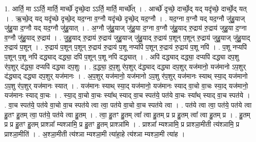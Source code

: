 \documentclass[17pt]{extarticle}
\begin{document}
1. आर्ति॒ मा ऽऽर्ति॒ मार्ति॒ मार्च्छे॑ दृच्छे॒दा ऽऽर्ति॒ मार्ति॒ मार्च्छे᳚त् । . आर्च्छे॑ दृच्छे॒ दार्च्छे॒द् यद् यदृ॑च्छे॒ दार्च्छे॒द् यत् । . ऋ॒च्छे॒द् यद् यदृ॑च्छे दृच्छे॒द् यद॒ग्ना व॒ग्नौ यदृ॑च्छे दृच्छे॒द् यद॒ग्नौ । . यद॒ग्ना व॒ग्नौ यद् यद॒ग्नौ जु॑हु॒याज् जु॑हु॒या द॒ग्नौ यद् यद॒ग्नौ जु॑हु॒यात् । . अ॒ग्नौ जु॑हु॒याज् जु॑हु॒या द॒ग्ना व॒ग्नौ जु॑हु॒याद् रु॒द्राय॑ रु॒द्राय॑ जुहु॒या द॒ग्ना व॒ग्नौ जु॑हु॒याद् रु॒द्राय॑ । . जु॒हु॒याद् रु॒द्राय॑ रु॒द्राय॑ जुहु॒याज् जु॑हु॒याद् रु॒द्राय॑ प॒शून् प॒शून् रु॒द्राय॑ जुहु॒याज् जु॑हु॒याद् रु॒द्राय॑ प॒शून् । . रु॒द्राय॑ प॒शून् प॒शून् रु॒द्राय॑ रु॒द्राय॑ प॒शू नप्यपि॑ प॒शून् रु॒द्राय॑ रु॒द्राय॑ प॒शू नपि॑ । . प॒शू नप्यपि॑ प॒शून् प॒शू नपि॑ दद्ध्याद् दद्ध्या॒ दपि॑ प॒शून् प॒शू नपि॑ दद्ध्यात् । . अपि॑ दद्ध्याद् दद्ध्या॒ दप्यपि॑ दद्ध्या दप॒शु र॑प॒शुर् द॑द्ध्या॒ दप्यपि॑ दद्ध्या दप॒शुः । . द॒द्ध्या॒ द॒प॒शु र॑प॒शुर् द॑द्ध्याद् दद्ध्या दप॒शुर् यज॑मानो॒ यज॑मानो ऽप॒शुर् द॑द्ध्याद् दद्ध्या दप॒शुर् यज॑मानः । . अ॒प॒शुर् यज॑मानो॒ यज॑मानो ऽप॒शु र॑प॒शुर् यज॑मानः स्याथ् स्या॒द् यज॑मानो ऽप॒शु र॑प॒शुर् यज॑मानः स्यात् । . यज॑मानः स्याथ् स्या॒द् यज॑मानो॒ यज॑मानः स्याद् वा॒चो वा॒चः स्या॒द् यज॑मानो॒ यज॑मानः स्याद् वा॒चः । . स्या॒द् वा॒चो वा॒चः स्या᳚थ् स्याद् वा॒च स्पत॑ये॒ पत॑ये वा॒चः स्या᳚थ् स्याद् वा॒च स्पत॑ये । . वा॒च स्पत॑ये॒ पत॑ये वा॒चो वा॒च स्पत॑ये त्वा त्वा॒ पत॑ये वा॒चो वा॒च स्पत॑ये त्वा । . पत॑ये त्वा त्वा॒ पत॑ये॒ पत॑ये त्वा हु॒तꣳ हु॒तम् त्वा॒ पत॑ये॒ पत॑ये त्वा हु॒तम् । . त्वा॒ हु॒तꣳ हु॒तम् त्वा᳚ त्वा हु॒तम् प्र प्र हु॒तम् त्वा᳚ त्वा हु॒तम् प्र । . हु॒तम् प्र प्र हु॒तꣳ हु॒तम् प्राश्ञा᳚ म्यश्ञामि॒ प्र हु॒तꣳ हु॒तम् प्राश्ञा॑मि । . प्राश्ञा᳚ म्यश्ञामि॒ प्र प्राश्ञा॒मीती त्य॑श्ञामि॒ प्र प्राश्ञा॒मीति॑ । . अ॒श्ञा॒मीती त्य॑श्ञा म्यश्ञा॒मी त्या॑हा॒हे त्य॑श्ञा म्यश्ञा॒मी त्या॑ह । \newline
\end{document}

